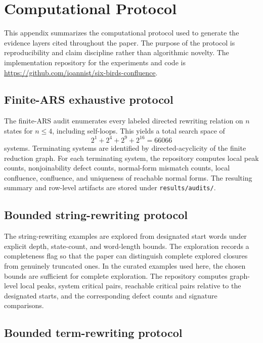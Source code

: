\documentclass[11pt]{article}
\numberwithin{equation}{section}
\theoremstyle{definition}
\theoremstyle{remark}
\begin{document}
 \section{Computational Protocol}
\label{app:computational-protocol}

This appendix summarizes the computational protocol used to generate the evidence layers cited throughout the paper. The purpose of the protocol is reproducibility and claim discipline rather than algorithmic novelty.
The implementation repository for the experiments and code is \url{https://github.com/ioannist/six-birds-confluence}.

\subsection{Finite-ARS exhaustive protocol}

The finite-ARS audit enumerates every labeled directed rewriting relation on $n$ states for $n \leq 4$, including self-loops. This yields a total search space of
\[
2^1 + 2^4 + 2^9 + 2^{16} = 66066
\]
systems. Terminating systems are identified by directed-acyclicity of the finite reduction graph. For each terminating system, the repository computes local peak counts, nonjoinability defect counts, normal-form mismatch counts, local confluence, confluence, and uniqueness of reachable normal forms. The resulting summary and row-level artifacts are stored under \texttt{results/audits/}.

\subsection{Bounded string-rewriting protocol}

The string-rewriting examples are explored from designated start words under explicit depth, state-count, and word-length bounds. The exploration records a completeness flag so that the paper can distinguish complete explored closures from genuinely truncated ones. In the curated examples used here, the chosen bounds are sufficient for complete exploration. The repository computes graph-level local peaks, system critical pairs, reachable critical pairs relative to the designated starts, and the corresponding defect counts and signature comparisons.

\subsection{Bounded term-rewriting protocol}
\end{document}
